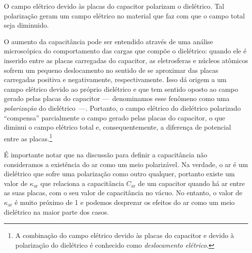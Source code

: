 \begin{marginfigure}
    \centering
    \caption{O campo elétrico devido às placas do capacitor polarizam o dielétrico. Tal polarização geram um campo elétrico no material que faz com que o campo total seja diminuido.}
\end{marginfigure}
O aumento da capacitância pode ser entendido através de uma análise microscópica do comportamento das cargas que compõe o dielétrico: quando ele é inserido entre as placas carregadas do capacitor, as eletrosferas e núcleos atômicos sofrem um pequeno deslocamento no sentido de se aproximar das placas carregadas positiva e negativamente, respectivamente. Isso dá origem a um campo elétrico devido ao próprio dielétrico e que tem sentido oposto ao campo gerado pelas placas do capacitor ---~denominamos esse fenômeno como uma \emph{polarização} do dielétrico~---. Portanto, o campo elétrico do dielétrico polarizado ``compensa'' parcialmente o campo gerado pelas placas do capacitor, o que diminui o campo elétrico total e, consequentemente, a diferença de potencial entre as placas.\footnote{A combinação do campo elétrico devido às placas do capacitor e devido à polarização do dielétrico é conhecido como \emph{deslocamento elétrico}.}

É importante notar que na discussão para definir a capacitância não consideramos a existência do ar como um meio polarizável. Na verdade, o ar é um dielétrico que sofre uma polarização como outro qualquer, portanto existe um valor de $\kappa_{\text{ar}}$ que relaciona a capacitância $C_{\text{ar}}$ de um capacitor quando há ar entre as suas placas, com o seu valor de capacitância no vácuo. No entanto, o valor de $\kappa_{\text{ar}}$ é muito próximo de 1 e podemos desprezar os efeitos do ar como um meio dielétrico na maior parte dos casos.

